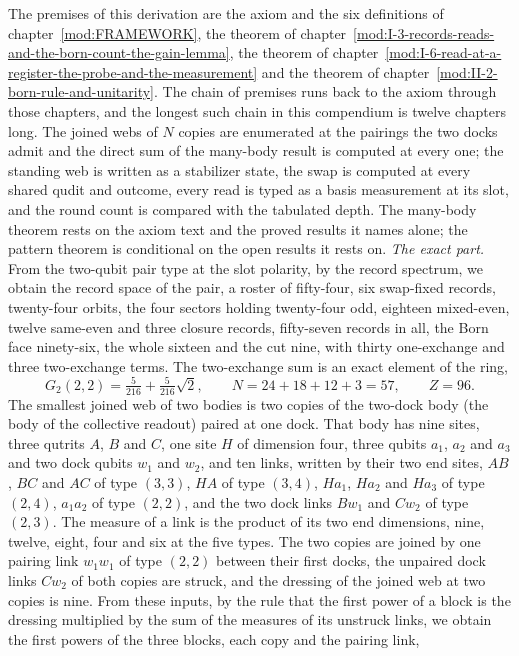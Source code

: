 \begin{chproof}
The premises of this derivation are the axiom and the six definitions of chapter~\ref{mod:FRAMEWORK}, the theorem of chapter~\ref{mod:I-3-records-reads-and-the-born-count-the-gain-lemma}, the theorem of chapter~\ref{mod:I-6-read-at-a-register-the-probe-and-the-measurement} and the theorem of chapter~\ref{mod:II-2-born-rule-and-unitarity}. The chain of premises runs back to the axiom through those chapters, and the longest such chain in this compendium is twelve chapters long.
The joined webs of $N$ copies are enumerated at the pairings the two docks admit and the direct sum of the many-body result is computed at every one; the standing web is written as a stabilizer state, the swap is computed at every shared qudit and outcome, every read is typed as a basis measurement at its slot, and the round count is compared with the tabulated depth. The many-body theorem rests on the axiom text and the proved results it names alone; the pattern theorem is conditional on the open results it rests on.
\textit{The exact part.}
From the two-qubit pair type at the slot polarity, by the record spectrum, we obtain the record space of the pair, a roster of fifty-four, six swap-fixed records, twenty-four orbits, the four sectors holding twenty-four odd, eighteen mixed-even, twelve same-even and three closure records, fifty-seven records in all, the Born face ninety-six, the whole sixteen and the cut nine, with thirty one-exchange and three two-exchange terms. The two-exchange sum is an exact element of the ring,
\begin{equation}
G_{2}(2,2) = \tfrac{5}{216} + \tfrac{5}{216}\sqrt{2}, \qquad N = 24 + 18 + 12 + 3 = 57, \qquad Z = 96 .
\end{equation}
The smallest joined web of two bodies is two copies of the two-dock body (the body of the collective readout) paired at one dock. That body has nine sites, three qutrits $A$, $B$ and $C$, one site $H$ of dimension four, three qubits $a_{1}$, $a_{2}$ and $a_{3}$ and two dock qubits $w_{1}$ and $w_{2}$, and ten links, written by their two end sites, $AB$, $BC$ and $AC$ of type $(3,3)$, $HA$ of type $(3,4)$, $Ha_{1}$, $Ha_{2}$ and $Ha_{3}$ of type $(2,4)$, $a_{1}a_{2}$ of type $(2,2)$, and the two dock links $Bw_{1}$ and $Cw_{2}$ of type $(2,3)$. The measure of a link is the product of its two end dimensions, nine, twelve, eight, four and six at the five types. The two copies are joined by one pairing link $w_{1}w_{1}$ of type $(2,2)$ between their first docks, the unpaired dock links $Cw_{2}$ of both copies are struck, and the dressing of the joined web at two copies is nine. From these inputs, by the rule that the first power of a block is the dressing multiplied by the sum of the measures of its unstruck links, we obtain the first powers of the three blocks, each copy and the pairing link,

\end{chproof}
